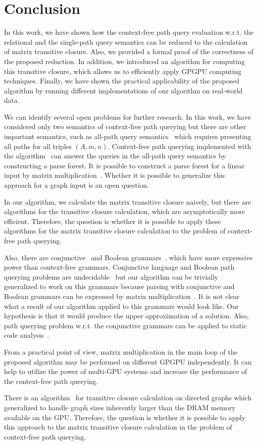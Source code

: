 \section{Conclusion}
In this work, we have shown how the context-free path query evaluation w.r.t. the relational and the single-path query semantics can be reduced to the calculation of matrix transitive closure. Also, we provided a formal proof of the correctness of the proposed reduction. In addition, we introduced an algorithm for computing this transitive closure, which allows us to efficiently apply GPGPU computing techniques. Finally, we have shown the practical applicability of the proposed algorithm by running different implementations of our algorithm on real-world data.

We can identify several open problems for further research. In this work, we have considered only two semantics of context-free path querying but there are other important semantics, such as all-path query semantics~\cite{hellingsPathQuerying} which requires presenting all paths for all triples $(A,m,n)$. Context-free path querying implemented with the algorithm~\cite{GLL} can answer the queries in the all-path query semantics by constructing a parse forest. It is possible to construct a parse forest for a linear input by matrix multiplication~\cite{okhotin_cyk}. Whether it is possible to generalize this approach for a graph input is an open question.

In our algorithm, we calculate the matrix transitive closure naively, but there are algorithms for the transitive closure calculation, which are asymptotically more efficient. Therefore, the question is whether it is possible to apply these algorithms for the matrix transitive closure calculation to the problem of context-free path querying.

Also, there are conjunctive~\cite{okhotinConjAndBool} and Boolean grammars~\cite{okhotinBoolean}, which have more expressive power than context-free grammars. Conjunctive language and Boolean path querying problems are undecidable~\cite{hellingsRelational} but our algorithm can be trivially generalized to work on this grammars because parsing with conjunctive and Boolean grammars can be expressed by matrix multiplication~\cite{okhotin_cyk}. It is not clear what a result of our algorithm applied to this grammars would look like. Our hypothesis is that it would produce the upper approximation of a solution. Also, path querying problem w.r.t. the conjunctive grammars can be applied to static code analysis~\cite{zhang2017context}.

From a practical point of view, matrix multiplication in the main loop of the proposed algorithm may be performed on different GPGPU independently. It can help to utilize the power of multi-GPU systems and increase the performance of the context-free path querying.

There is an algorithm~\cite{apspGPU} for transitive closure calculation on directed graphs which generalized to handle graph sizes inherently larger than the DRAM memory available on the GPU. Therefore, the question is whether it is possible to apply this approach to the matrix transitive closure calculation in the problem of context-free path querying.
